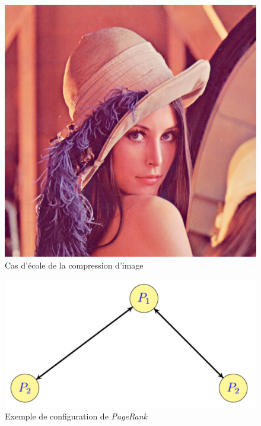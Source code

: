 \documentclass[a4paper,10pt]{report}
\begin{document}
\begin{minipage}[c]{.30\linewidth}
	\begin{figure}[H]
	\centering
	\caption{Cas d'école de la compression d'image}
	\includegraphics[width=\textwidth]{lena.png}
	\end{figure}
\end{minipage}
\begin{minipage}[c]{.05\linewidth}
\end{minipage} \hfill
\begin{minipage}[c]{.60\linewidth}
	\begin{figure}[H]
	\centering
	\caption{Exemple de configuration de \textit{PageRank}}
	\includegraphics[width=\textwidth]{config1.png}
	\end{figure}
\end{minipage} \hfill
\end{document}
